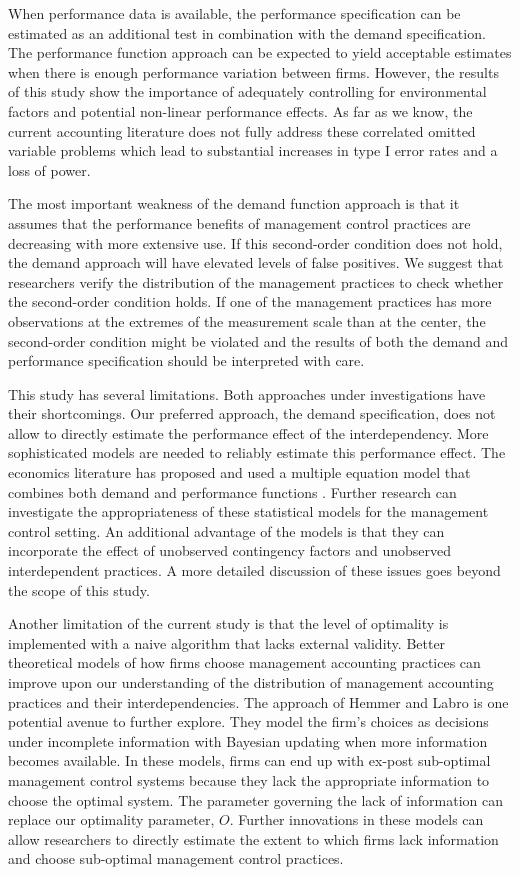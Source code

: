 \documentclass[12pt]{article}
\begin{document}
When performance data is available, the performance specification can be estimated as an additional test in combination with the demand specification. The performance function approach can be expected to yield acceptable estimates when there is enough performance variation between firms. However, the results of this study show the importance of adequately controlling for environmental factors and potential non-linear performance effects. As far as we know, the current accounting literature does not fully address these correlated omitted variable problems which lead to substantial increases in type I error rates and a loss of power.

The most important weakness of the demand function approach is that it assumes that the performance benefits of management control practices are decreasing with more extensive use. If this second-order condition does not hold, the demand approach will have elevated levels of false positives. We suggest that researchers verify the distribution of the management practices to check whether the second-order condition holds. If one of the management practices has more observations at the extremes of the measurement scale than at the center, the second-order condition might be violated and the results of both the demand and performance specification should be interpreted with care.

This study has several limitations. Both approaches under investigations have their shortcomings. Our preferred approach, the demand specification, does not allow to directly estimate the performance effect of the interdependency. More sophisticated models are needed to reliably estimate this performance effect. The economics literature has proposed and used a multiple equation model that combines both demand and performance functions \citep{Athey1998, Gentzkow2007, Kretschmer2012, Miravete2006}. Further research can investigate the appropriateness of these statistical models for the management control setting. An additional advantage of the models is that they can incorporate the effect of unobserved contingency factors and unobserved interdependent practices. A more detailed discussion of these issues goes beyond the scope of this study.

Another limitation of the current study is that the level of optimality is implemented with a naive algorithm that lacks external validity. Better theoretical models of how firms choose management accounting practices can improve upon our understanding of the distribution of management accounting practices and their interdependencies. The approach of Hemmer and Labro \citeyearpar{Hemmer2015} is one potential avenue to further explore. They model the firm's choices as decisions under incomplete information with Bayesian updating when more information becomes available. In these models, firms can end up with ex-post sub-optimal management control systems because they lack the appropriate information to choose the optimal system. The parameter governing the lack of information can replace our optimality parameter, \(O\). Further innovations in these models can allow researchers to directly estimate the extent to which firms lack information and choose sub-optimal management control practices.
\end{document}
